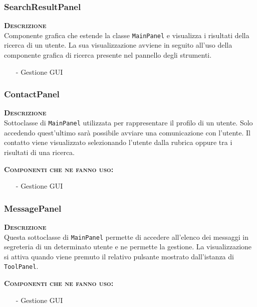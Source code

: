 \subsubsection{SearchResultPanel}
\begin{description}
  \item{\scshape\bfseries Descrizione}\\
Componente grafica che estende la classe \texttt{MainPanel} e visualizza i risultati della ricerca di un utente. La sua visualizzazione avviene in seguito all'uso della componente grafica di ricerca presente nel pannello degli strumenti.
  \begin{itemize}[noitemsep,nolistsep]
    \item[-] Gestione GUI
  \end{itemize}
\end{description}

\subsubsection{ContactPanel}
\begin{description}
  \item{\scshape\bfseries Descrizione}\\
Sottoclasse di \texttt{MainPanel} utilizzata per rappresentare il profilo di un utente. Solo accedendo quest'ultimo sarà possibile avviare una comunicazione con l'utente. Il contatto viene visualizzato selezionando l'utente dalla rubrica oppure tra i risultati di una ricerca.
  \item{\scshape\bfseries Componenti che ne fanno uso:}
  \begin{itemize}[noitemsep,nolistsep]
    \item[-] Gestione GUI
  \end{itemize}
\end{description}

\subsubsection{MessagePanel}
\begin{description}
  \item{\scshape\bfseries Descrizione}\\
Questa sottoclasse di \texttt{MainPanel} permette di accedere all'elenco dei messaggi in segreteria di un determinato utente e ne permette la gestione. La visualizzazione si attiva quando viene premuto il relativo pulsante mostrato dall'istanza di \texttt{ToolPanel}.
  \item{\scshape\bfseries Componenti che ne fanno uso:}
  \begin{itemize}[noitemsep,nolistsep]
    \item[-] Gestione GUI
  \end{itemize}
\end{description}

